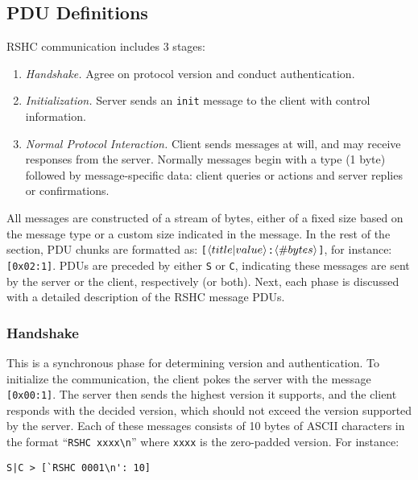 \subsection{PDU Definitions}
\label{sec:pdus:pdu}

RSHC communication includes 3 stages:

\begin{enumerate}

\item {\em Handshake.} Agree on protocol version and conduct authentication.

\item {\em Initialization.} Server sends an {\tt init} message to the client with control information.

\item {\em Normal Protocol Interaction.} Client sends messages at will, and may receive responses from the server. Normally messages begin with a type (1 byte) followed by message-specific data: client queries or actions and server replies or confirmations.

\end{enumerate}

All messages are constructed of a stream of bytes, either of a fixed size based on the message type or a custom size indicated in the message. In the rest of the section, PDU chunks are formatted as: {\tt [$\left \langle title | value \right \rangle $:$\left \langle \#bytes \right \rangle $]}, for instance: {\tt [0x02:1]}. PDUs are preceded by either {\tt S} or {\tt C}, indicating these messages are sent by the server or the client, respectively (or both).
Next, each phase is discussed with a detailed description of the RSHC message PDUs.

\subsubsection{Handshake}
\label{sec:pdus:pdu:hs}

This is a synchronous phase for determining version and authentication. To initialize the communication, the client pokes the server with the message {\tt [0x00:1]}. The server then sends the highest version it supports, and the client responds with the decided version, which should not exceed the version supported by the server. Each of these messages consists of 10 bytes of ASCII characters in the format ``{\tt RSHC xxxx\textbackslash n}'' where {\tt xxxx} is the zero-padded version. For instance:

\begin{verbatim}
S|C > [`RSHC 0001\n': 10]
\end{verbatim}

